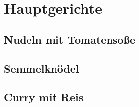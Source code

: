 \section{Hauptgerichte}\label{sec:hauptgerichte}
\subsection{Nudeln mit Tomatensoße}\label{subsec:nudeln-mit-tomatensaue}
\subsection{Semmelknödel}\label{subsec:semmelknodel}
\subsection{Curry mit Reis}\label{subsec:curry-mit-reis}

